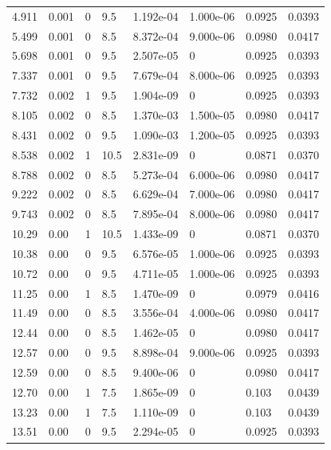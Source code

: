 \documentclass[preview]{standalone}
\begin{document}
{{\begin{tabular}{L{1.2cm}C{1.2cm} C{0.3cm}C{0.5cm} C{1.4cm}C{1.4cm} C{1.4cm}C{1.4cm}}
  4.911  &  0.001  & 0     & 9.5 &  1.192e-04  & 1.000e-06  & 0.0925 &  0.0393   \\ 
  5.499  &  0.001  & 0     & 8.5 &  8.372e-04  & 9.000e-06  & 0.0980 &  0.0417   \\ 
  5.698  &  0.001  & 0     & 9.5 &  2.507e-05  & 0  & 0.0925 &  0.0393   \\ 
  7.337  &  0.001  & 0     & 9.5 &  7.679e-04  & 8.000e-06  & 0.0925 &  0.0393   \\ 
  7.732  &  0.002  & 1     & 9.5 &  1.904e-09  & 0  & 0.0925 &  0.0393   \\ 
  8.105  &  0.002  & 0     & 8.5 &  1.370e-03  & 1.500e-05  & 0.0980 &  0.0417   \\ 
  8.431  &  0.002  & 0     & 9.5 &  1.090e-03  & 1.200e-05  & 0.0925 &  0.0393   \\ 
  8.538  &  0.002  & 1     & 10.5 &  2.831e-09  & 0  & 0.0871 &  0.0370   \\ 
  8.788  &  0.002  & 0     & 8.5 &  5.273e-04  & 6.000e-06  & 0.0980 &  0.0417   \\ 
  9.222  &  0.002  & 0     & 8.5 &  6.629e-04  & 7.000e-06  & 0.0980 &  0.0417   \\ 
  9.743  &  0.002  & 0     & 8.5 &  7.895e-04  & 8.000e-06  & 0.0980 &  0.0417   \\ 
  10.29  &  0.00  & 1     & 10.5 &  1.433e-09  & 0  & 0.0871 &  0.0370   \\ 
  10.38  &  0.00  & 0     & 9.5 &  6.576e-05  & 1.000e-06  & 0.0925 &  0.0393   \\ 
  10.72  &  0.00  & 0     & 9.5 &  4.711e-05  & 1.000e-06  & 0.0925 &  0.0393   \\ 
  11.25  &  0.00  & 1     & 8.5 &  1.470e-09  & 0  & 0.0979 &  0.0416   \\ 
  11.49  &  0.00  & 0     & 8.5 &  3.556e-04  & 4.000e-06  & 0.0980 &  0.0417   \\ 
  12.44  &  0.00  & 0     & 8.5 &  1.462e-05  & 0  & 0.0980 &  0.0417   \\ 
  12.57  &  0.00  & 0     & 9.5 &  8.898e-04  & 9.000e-06  & 0.0925 &  0.0393   \\ 
  12.59  &  0.00  & 0     & 8.5 &  9.400e-06  & 0  & 0.0980 &  0.0417   \\ 
  12.70  &  0.00  & 1     & 7.5 &  1.865e-09  & 0  & 0.103 &  0.0439   \\ 
  13.23  &  0.00  & 1     & 7.5 &  1.110e-09  & 0  & 0.103 &  0.0439   \\ 
  13.51  &  0.00  & 0     & 9.5 &  2.294e-05  & 0  & 0.0925 &  0.0393   \\ 

\end{tabular}}}
\end{document}
